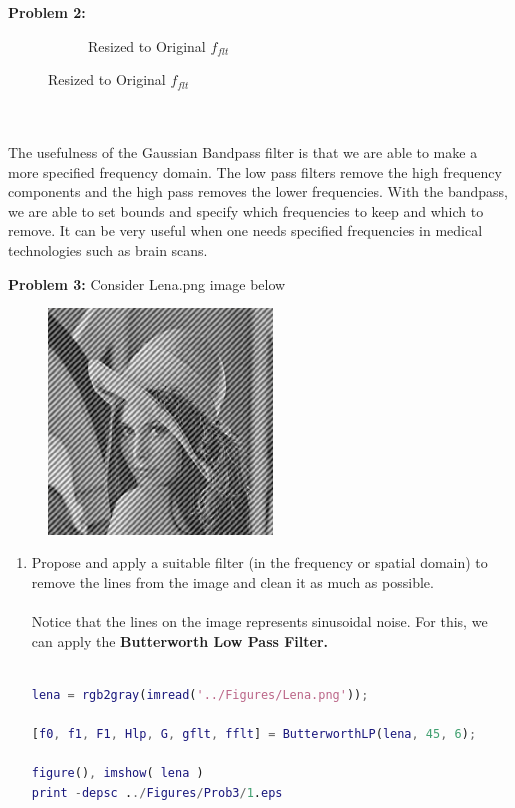 \documentclass[11pt]{article}
\newenvironment{problem}[1]{\textbf{Problem #1: }}{\newpage}
\begin{document}
\begin{problem}{2}
\begin{enumerate}[label = (\alph*)]
\begin{figure}[h!]
\begin{subfigure}[h!]{.4\textwidth}
					\caption{Resized to Original $f_{flt}$}
				\end{subfigure}
			\end{figure}
			\\ \\
			The usefulness of the Gaussian Bandpass filter is that we are able to make a more specified frequency domain.  The low pass filters remove the high frequency components and the high pass removes the lower frequencies.  With the bandpass, we are able to set bounds and specify which frequencies to keep and which to remove.  It can be very useful when one needs specified frequencies in medical technologies such as brain scans.  
		\end{enumerate}
	\end{problem}

	\begin{problem}{3}
		Consider Lena.png image below
		\begin{figure}[h!]
			\centering
			\includegraphics[height = 6cm]{Figures/Lena.png}
		\end{figure}
		\begin{enumerate}[label = (\alph*)]
			\item Propose and apply a suitable filter (in the frequency or spatial domain) to remove the lines from the image and clean it as much as possible.
			\\ \\
			Notice that the lines on the image represents sinusoidal noise.  For this, we can apply the \textbf{Butterworth Low Pass Filter.}
			\\ \\
\begin{lstlisting}[language=Matlab]
lena = rgb2gray(imread('../Figures/Lena.png'));

[f0, f1, F1, Hlp, G, gflt, fflt] = ButterworthLP(lena, 45, 6);

figure(), imshow( lena )
print -depsc ../Figures/Prob3/1.eps


\end{lstlisting}
\end{enumerate}
\end{problem}
\end{document}
